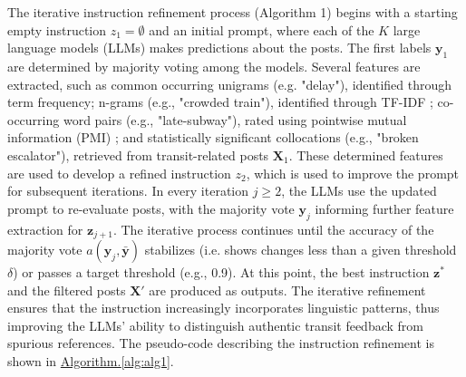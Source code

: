 \documentclass[a4paper,fleqn,12pt]{cas-sc}
\begin{document}
 The iterative instruction refinement process (Algorithm 1) begins with a starting empty instruction \(z_1 = \emptyset\) and an initial prompt, where each of the \(K\) large language models (LLMs) makes predictions about the posts. The first labels \(\boldsymbol{y}_1\) are determined by majority voting among the models. Several features are extracted, such as common occurring unigrams (e.g. "delay"), identified through term frequency; n-grams (e.g., "crowded train"), identified through TF-IDF \citep{qaiser2018text}; co-occurring word pairs (e.g., "late-subway"), rated using pointwise mutual information (PMI) \citep{khan2016sentimi}; and statistically significant collocations (e.g., "broken escalator"), retrieved from transit-related posts \(\boldsymbol{X}_1\). These determined features are used to develop a refined instruction \(z_2\), which is used to improve the prompt for subsequent iterations. In every iteration \(j \geq 2\), the LLMs use the updated prompt to re-evaluate posts, with the majority vote \(\boldsymbol{y}_j\) informing further feature extraction for \(\boldsymbol{z}_{j+1}\). The iterative process continues until the accuracy of the majority vote \(a(\boldsymbol{y}_j, \boldsymbol{\bar{y}})\) stabilizes (i.e. shows changes less than a given threshold \(\delta\)) or passes a target threshold (e.g., 0.9). At this point, the best instruction \(\boldsymbol{z}^*\) and the filtered posts \(\boldsymbol{X}'\) are produced as outputs. The iterative refinement ensures that the instruction increasingly incorporates linguistic patterns, thus improving the LLMs' ability to distinguish authentic transit feedback from spurious references. The pseudo-code describing the instruction refinement is shown in \hyperref[alg:alg1]{Algorithm.\ref{alg:alg1}}.
\end{document}
